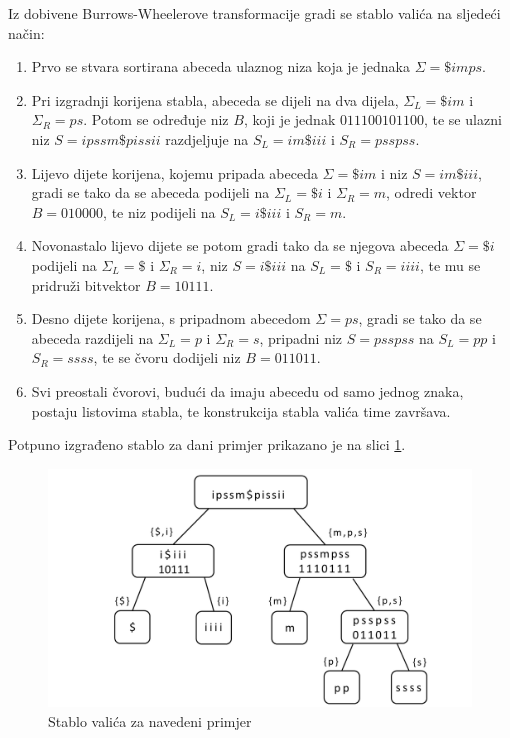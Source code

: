 \documentclass[a4paper,12pt]{article}
\begin{document}
Iz dobivene Burrows-Wheelerove transformacije gradi se stablo valića na sljedeći način:
\begin{enumerate}
	\item Prvo se stvara sortirana abeceda ulaznog niza koja je jednaka $\Sigma=\$imps$.

	\item Pri izgradnji korijena stabla, abeceda se dijeli na dva dijela, $\Sigma_L = \$im$ i $\Sigma_R = ps$. Potom se određuje niz $B$, koji je jednak $011100101100$, te se ulazni niz $S = ipssm\$pissii$ razdjeljuje na $S_L = im\$iii$ i $S_R = psspss$.

	\item Lijevo dijete korijena, kojemu pripada abeceda $\Sigma = \$im$ i niz $S = im\$iii$, gradi se tako da se abeceda podijeli na $\Sigma_L = \$i$ i $\Sigma_R = m$, odredi vektor $B = 010000$, te niz podijeli na $S_L = i\$iii$ i $S_R = m$.

	\item Novonastalo lijevo dijete se potom gradi tako da se njegova abeceda $\Sigma = \$i$ podijeli na $\Sigma_L = \$$ i $\Sigma_R = i$, niz $S = i\$iii$ na $S_L = \$$ i $S_R = iiii$, te mu se pridruži bitvektor $B = 10111$.

	\item Desno dijete korijena, s pripadnom abecedom $\Sigma = ps$, gradi se tako da se abeceda razdijeli na $\Sigma_L = p$ i $\Sigma_R = s$, pripadni niz $S = psspss$ na $S_L = pp$ i $S_R = ssss$, te se čvoru dodijeli niz $B = 011011$.

	\item Svi preostali čvorovi, budući da imaju abecedu od samo jednog znaka, postaju listovima stabla, te konstrukcija stabla valića time završava.

\end{enumerate}

Potpuno izgrađeno stablo za dani primjer prikazano je na slici \ref{fig:waveletTree}.

	\begin{figure}[h!]
		\begin{center}
			\includegraphics[width=\columnwidth]{waveletTree.png}
			\caption{Stablo valića za navedeni primjer}
			\label{fig:waveletTree}
		\end{center}
	\end{figure}
\end{document}
